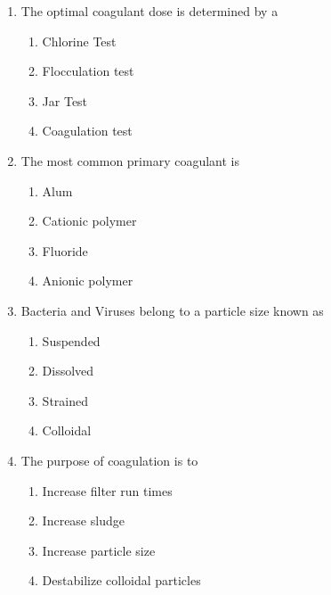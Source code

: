 \documentclass[10pt]{article}
\begin{document}
\begin{enumerate}
\begin{enumerate}
\item The optimal coagulant dose is determined by a\\
\begin{enumerate}
\item Chlorine Test\\
\item Flocculation test\\
\item Jar Test\\
\item Coagulation test
\end{enumerate}

\item  The most common primary coagulant is\\
\begin{enumerate}
\item Alum\\
\item Cationic polymer\\
\item Fluoride\\
\item Anionic polymer
\end{enumerate}

\item  Bacteria and Viruses belong to a particle size known as\\
\begin{enumerate}
\item Suspended\\
\item Dissolved\\
\item Strained\\
\item Colloidal
\end{enumerate}

\item  The purpose of coagulation is to\\
\begin{enumerate}
\item Increase filter run times\\
\item Increase sludge\\
\item Increase particle size\\
\item Destabilize colloidal particles
\end{enumerate}


\end{enumerate}
\end{enumerate}
\end{document}
